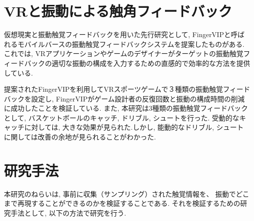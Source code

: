 \section{VRと振動による触角フィードバック}
仮想現実と振動触覚フィードバックを用いた先行研究として, FingerVIPと呼ばれるモバイルバースの振動触覚フィードバックシステム\cite{vibration}を提案したものがある.
これでは, VRアプリケーションやゲームのデザイナーがターゲットの振動触覚フィードバックの適切な振動の構成を入力するための直感的で効率的な方法を提供している.

提案されたFingerVIPを利用してVRスポーツゲームで３種類の振動触覚フィードバックを設定し, FingerVIPがゲーム設計者の反復回数と振動の構成時間の削減に成功したことを検証している.
また, 本研究は3種類の振動触覚フィードバックとして, バスケットボールのキャッチ, ドリブル, シュートを行った.
受動的なキャッチに対しては, 大きな効果が見られた.しかし, 能動的なドリブル, シュートに関しては改善の余地が見られることがわかった.
\section{研究手法}
本研究のねらいは, 事前に収集（サンプリング）された触覚情報を、
振動でどこまで再現することができるのかを検証することである.
それを検証するための研究手法として, 以下の方法で研究を行う.


